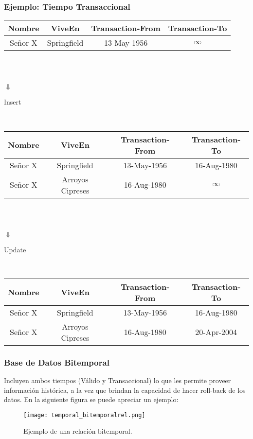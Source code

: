 \documentclass[a4paper,12pt,oneside]{report}
\begin{document}
\subsubsection*{Ejemplo: Tiempo Transaccional}
\begin{center}
\begin{tabular}{|c|c|c|c|}
\hline
Nombre & ViveEn & Transaction-From & Transaction-To\\
\hline
Se\~nor X & Springfield & 13-May-1956 & $\infty$\\
\hline
\end{tabular}
\\
\ \\
\begin{Huge}{$\Downarrow$}\end{Huge}\begin{small}{Insert}\end{small}\\
\begin{tabular}{|c|c|c|c|}
\hline
Nombre & ViveEn & Transaction-From & Transaction-To\\
\hline
Se\~nor X & Springfield & 13-May-1956 & 16-Aug-1980\\
\hline
Se\~nor X & Arroyos Cipreses & 16-Aug-1980 & $\infty$\\
\hline
\end{tabular}
\\
\ \\
\begin{Huge}{$\Downarrow$}\end{Huge}\begin{small}{Update}\end{small}\\
\begin{tabular}{|c|c|c|c|}
\hline
Nombre & ViveEn & Transaction-From & Transaction-To\\
\hline
Se\~nor X & Springfield & 13-May-1956 & 16-Aug-1980\\
\hline
Se\~nor X & Arroyos Cipreses & 16-Aug-1980 & 20-Apr-2004\\
\hline
\end{tabular}

\end{center}

\subsubsection*{Base de Datos Bitemporal}
Incluyen ambos tiempos (V\'alido y Transaccional) lo que les permite proveer informaci\'on hist\'orica, a la vez que brindan la capacidad de hacer roll-back de los datos. En la siguiente figura se puede apreciar un ejemplo:
\begin{figure}[h]
\center \texttt{[image: temporal\_bitemporalrel.png]}
\caption{Ejemplo de una relaci\'on bitemporal.}
\end{figure}
\end{document}
